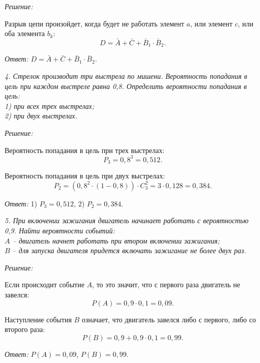 \vspace*{1em}
\emph{Решение:}

Разрыв цепи произойдет, когда будет не работать элемент \( a \), или элемент
\( c \), или оба элемента \( b_k \):
\[
    D = \bar{A} + \bar{C} + \bar{B}_1\cdot\bar{B}_2.
\]

\vspace*{1em}
\emph{Ответ:} \( D = \bar{A} + \bar{C} + \bar{B}_1\cdot\bar{B}_2 \).

\vspace*{2em}

\emph{4. Стрелок производит три выстрела по мишени. Вероятность попадания в цель при
каждом выстреле равна 0,8. Определить вероятности попадания в цель: \\
1) при всех трех выстрелах; \\
2) при двух выстрелах.}

\vspace*{2em}
\emph{Решение:}

Вероятность попадания в цель при трех выстрелах:
\[
    P_3 = 0,8^3 = 0,512.
\]

Вероятность попадания в цель при двух выстрелах:
\[
    P_2 = (0,8^2 \cdot (1-0,8))\cdot C_3^2 = 3 \cdot 0,128 = 0,384.
\]

\vspace*{1em}
\emph{Ответ:} 1) \( P_3 = 0,512 \), 2) \( P_2 = 0,384 \).

\pagebreak

\emph{5. При включении зажигания двигатель начинает работать с вероятностью 0,9.
Найти вероятности событий: \\ 
\( A \) -- двигатель начнет работать при втором включении зажигания; \\ 
\( B \) -- для запуска двигателя придется включать зажигание не более двух раз.}

\vspace*{2em}
\emph{Решение:}

Если происходит событие \( A \), то это значит, что с первого раза двигатель не
завелся:
\[
    P(A) = 0,9\cdot 0,1 = 0,09.
\]

Наступление события \( B \) означает, что двигатель завелся либо с первого, либо
со второго раза:
\[
    P(B) = 0,9 + 0,9\cdot 0,1 = 0,99.
\]

\vspace*{2em}
\emph{Ответ:} \( P(A) = 0,09 \), \( P(B) = 0,99 \).

\vspace*{2em}

